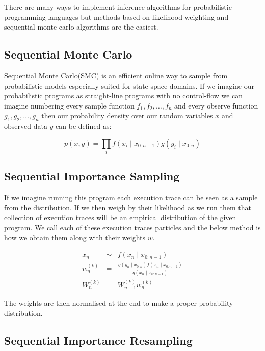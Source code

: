 \documentclass[
]{ceurart}
\begin{document}
There are many ways to implement inference algorithms for probabilistic
programming languages but methods based on likelihood-weighting and
sequential monte carlo algorithms are the easiest.

\subsection{Sequential Monte Carlo}

Sequential Monte Carlo\cite{chopin2020introduction}(SMC) is an efficient
online way to sample from probabilistic models especially suited for
state-space domains. If we imagine our probabilistic programs as
straight-line programs with no control-flow we can imagine numbering
every sample function $f_1, f_2, \ldots, f_n$ and every observe
function $g_1, g_2, \ldots, g_n$ then our probability density over our
random variables $x$ and observed data $y$ can be defined as:

\begin{equation}
  p(x, y) = \prod_i f(x_i \mid x_{0:n-1})g(y_i \mid x_{0:n})
\end{equation}

\subsection{Sequential Importance Sampling}

If we imagine running this program each execution trace can be seen as
a sample from the distribution. If we then weigh by their likelihood
as we run them that collection of execution traces will be an empirical
distribution of the given program. We call each of these execution traces
particles and the below method is how we obtain them along with their weights $w$.

\begin{eqnarray}
  x_n &\sim& f(x_n \mid x_{0:n-1}) \\
  w_n^{(k)} &=& \frac{g(y_n \mid x_{0:n})f(x_n \mid x_{0:n-1})}{q(x_n \mid x_{0:n-1})} \\
  W_n^{(k)} &=& W_{n-1}^{(k)} w_n^{(k)}
\end{eqnarray}

The weights are then normalised at the end to make a proper probability distribution.

\subsection{Sequential Importance Resampling}
\end{document}
